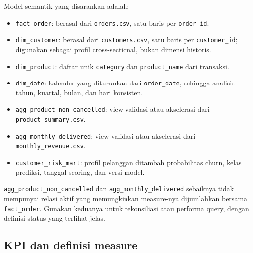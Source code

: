 \documentclass[
  indonesian,
  letterpaper,
  DIV=11,
  numbers=noendperiod]{scrreprt}
\providecommand{\tightlist}{%
  \setlength{\itemsep}{0pt}\setlength{\parskip}{0pt}}
\begin{document}
Model semantik yang disarankan adalah:

\begin{itemize}
\tightlist
\item
  \texttt{fact\_order}: berasal dari \texttt{orders.csv}, satu baris per
  \texttt{order\_id}.
\item
  \texttt{dim\_customer}: berasal dari \texttt{customers.csv}, satu
  baris per \texttt{customer\_id}; digunakan sebagai profil
  cross-sectional, bukan dimensi historis.
\item
  \texttt{dim\_product}: daftar unik \texttt{category} dan
  \texttt{product\_name} dari transaksi.
\item
  \texttt{dim\_date}: kalender yang diturunkan dari
  \texttt{order\_date}, sehingga analisis tahun, kuartal, bulan, dan
  hari konsisten.
\item
  \texttt{agg\_product\_non\_cancelled}: view validasi atau akselerasi
  dari \texttt{product\_summary.csv}.
\item
  \texttt{agg\_monthly\_delivered}: view validasi atau akselerasi dari
  \texttt{monthly\_revenue.csv}.
\item
  \texttt{customer\_risk\_mart}: profil pelanggan ditambah probabilitas
  churn, kelas prediksi, tanggal scoring, dan versi model.
\end{itemize}

\texttt{agg\_product\_non\_cancelled} dan
\texttt{agg\_monthly\_delivered} sebaiknya tidak mempunyai relasi aktif
yang memungkinkan measure-nya dijumlahkan bersama \texttt{fact\_order}.
Gunakan keduanya untuk rekonsiliasi atau performa query, dengan definisi
status yang terlihat jelas.

\subsection*{KPI dan definisi measure}\label{kpi-dan-definisi-measure}
\end{document}
